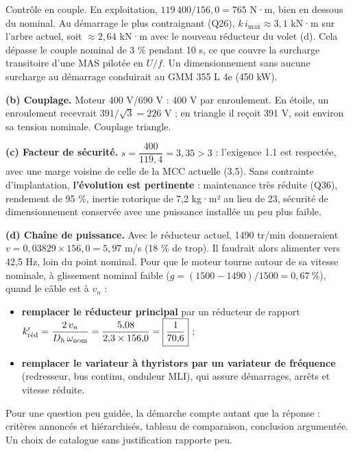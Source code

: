 \documentclass[11pt,a4paper]{article}
\providecommand{\tightlist}{\setlength{\itemsep}{0pt}\setlength{\parskip}{0pt}}
\begin{document}
Contrôle en couple. En exploitation, \(119\,400/156{,}0=765\) N·m, bien en dessous du nominal. Au démarrage le plus contraignant (Q26), \(k\,i_{\max}\approx3{,}1\) kN·m sur l'arbre actuel, soit \(\approx2{,}64\) kN·m avec le nouveau réducteur du volet (d). Cela dépasse le couple nominal de 3 \% pendant 10 s, ce que couvre la surcharge transitoire d'une MAS pilotée en \(U/f\). Un dimensionnement sans aucune surcharge au démarrage conduirait au GMM 355 L 4e (450 kW).

\textbf{(b) Couplage.} Moteur 400 V/690 V : 400 V par enroulement. En étoile, un enroulement recevrait \(391/\sqrt3=226\) V ; en triangle il reçoit 391 V, soit environ sa tension nominale. \(\boxed{\text{Couplage triangle}}\).

\textbf{(c) Facteur de sécurité.} \(s=\dfrac{400}{119{,}4}=\boxed{3{,}35}>3\) : l'exigence 1.1 est respectée, avec une marge voisine de celle de la MCC actuelle (3,5). Sans contrainte d'implantation, \textbf{l'évolution est pertinente} : maintenance très réduite (Q36), rendement de 95 \%, inertie rotorique de 7,2 kg·m² au lieu de 23, sécurité de dimensionnement conservée avec une puissance installée un peu plus faible.

\textbf{(d) Chaîne de puissance.} Avec le réducteur actuel, 1490 tr/min donneraient \(v=0{,}03829\times156{,}0=5{,}97\) m/s (18 \% de trop). Il faudrait alors alimenter vers 42,5 Hz, loin du point nominal. Pour que le moteur tourne autour de sa vitesse nominale, à glissement nominal faible (\(g=(1500-1490)/1500=0{,}67\ \%\)), quand le câble est à \(v_n\) :

\begin{itemize}
\tightlist
\item
  \textbf{remplacer le réducteur principal} par un réducteur de rapport \(k'_{\text{\text{réd}}}=\dfrac{2\,v_n}{D_h\,\omega_{\text{nom}}}=\dfrac{5{,}08}{2{,}3\times156{,}0}=\boxed{\dfrac1{70{,}6}}\) ;
\item
  \textbf{remplacer le variateur à thyristors par un variateur de fréquence} (redresseur, bus continu, onduleur MLI), qui assure démarrages, arrêts et vitesse réduite.
\end{itemize}

\begin{jury}

Pour une question peu guidée, la démarche compte autant que la réponse : critères annoncés et hiérarchisés, tableau de comparaison, conclusion argumentée. Un choix de catalogue sans justification rapporte peu.

\end{jury}
\end{document}
